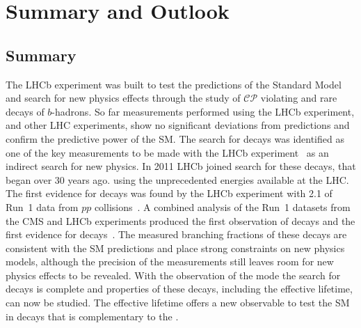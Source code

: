 \chapter{Summary and Outlook}
\label{sec:summaryandoutlook}

\section{Summary}
The LHCb experiment was built to test the predictions of the Standard Model and search for new physics effects through the study of $\mathcal{CP}$ violating and rare decays of $b$-hadrons. So far measurements performed using the LHCb experiment, and other LHC experiments, show no significant deviations from predictions and confirm the predictive power of the SM. 
The search for \bmumu decays was identified as one of the key measurements to be made with the LHCb experiment~\cite{Adeva:2009ny} as an indirect search for new physics.
In 2011 LHCb joined search for these decays, that began over 30 years ago. using the unprecedented energies available at the LHC. The first evidence for \bsmumu decays was found by the LHCb experiment with 2.1 \fb of Run~1 data from $pp$ collisions~\cite{Aaij:2012nna}. A combined analysis of the Run~1 datasets from the CMS and LHCb experiments produced the first observation of \bsmumu decays and the first evidence for \bdmumu decays~\cite{CMS:2014xfa}. The measured branching fractions of these decays are consistent with the SM predictions and place strong constraints on new physics models, although the precision of the measurements still leaves room for new physics effects to be revealed. With the observation of the \bs mode the search for \bsmumu decays is complete and properties of these decays, including the effective lifetime, can now be studied. The effective lifetime offers a new observable to test the SM in \bsmumu decays that is complementary to the \BF. 

